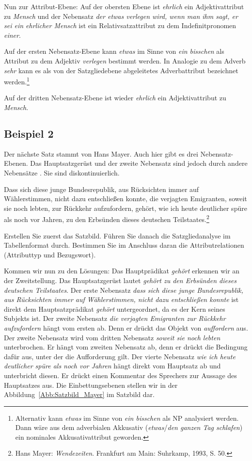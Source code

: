 Nun zur Attribut-Ebene: Auf der obersten Ebene ist \textit{ehrlich} ein Adjektivattribut zu \textit{Mensch} und der Nebensatz \textit{der etwas verlegen wird, wenn man ihm sagt, er sei ein ehrlicher Mensch} ist ein Relativsatzattribut zu dem Indefinitpronomen \textit{einer}. 

Auf der ersten Nebensatz-Ebene kann \textit{etwas} im Sinne von \textit{ein bisschen} als Attribut zu dem Adjektiv \textit{verlegen} bestimmt werden. In Analogie zu dem Adverb \textit{sehr} kann es als von der Satzgliedebene abgeleitetes Adverbattribut bezeichnet werden.\footnote{Alternativ kann \textit{etwas} im Sinne von \textit{ein bisschen} als NP analysiert werden. Dann wäre aus dem adverbialen Akkusativ (\textit{etwas}/\textit{den ganzen Tag schlafen}) ein nominales Akkusativattribut geworden.} 

Auf der dritten Nebensatz-Ebene ist wieder \textit{ehrlich} ein Adjektivattribut zu \textit{Mensch}.


\subsection{Beispiel 2}\label{subsection:Bsp2}

Der nächste Satz stammt von Hans Mayer. Auch hier gibt es drei Nebensatz-Ebenen. Das Hauptsatzgerüst und der zweite Nebensatz sind jedoch durch andere Nebensätze . Sie sind diskontinuierlich.

\ea \label{ea:Mayer_Satz} Dass sich diese junge Bundesrepublik, aus Rücksichten immer auf Wählerstimmen, nicht dazu entschließen konnte, die verjagten Emigranten, soweit sie noch lebten, zur Rückkehr aufzufordern, gehört, wie ich heute deutlicher spüre als noch vor Jahren, zu den Erbsünden dieses deutschen Teilstaates.\footnote{Hans Mayer: \textit{Wendezeiten}. Frankfurt am Main: Suhrkamp, 1993, S. 50.}
\z 

Erstellen Sie zuerst das Satzbild. Führen Sie danach die Satzgliedanalyse im Tabellenformat durch. Bestimmen Sie im Anschluss daran die Attributrelationen (Attributtyp und Bezugswort).


Kommen wir nun zu den Lösungen: Das Hauptprädikat \textit{gehört} erkennen wir an der Zweitstellung. Das Hauptsatzgerüst lautet \textit{gehört zu den Erbsünden dieses deutschen Teilstaates}. Der erste Nebensatz \textit{dass sich diese junge Bundesrepublik, aus Rücksichten immer auf Wählerstimmen, nicht dazu entschließen konnte} ist direkt dem Hauptsatzprädikat \textit{gehört} untergeordnet, da es der Kern seines Subjekts ist. Der zweite Nebensatz \textit{die verjagten Emigranten zur Rückkehr aufzufordern} hängt vom ersten ab. Denn er drückt das Objekt von \textit{auffordern} aus. Der zweite Nebensatz wird vom dritten Nebensatz \textit{soweit sie noch lebten} unterbrochen. Er hängt vom zweiten Nebensatz ab, denn er drückt die Bedingung dafür aus, unter der die Aufforderung gilt. Der vierte Nebensatz \textit{wie ich heute deutlicher spüre als noch vor Jahren} hängt direkt vom Hauptsatz ab und unterbricht diesen. Er drückt einen Kommentar des Sprechers zur Aussage des Hauptsatzes aus. Die Einbettungsebenen stellen wir in der Abbildung~\ref{Abb:Satzbild_Mayer} im Satzbild dar. 

